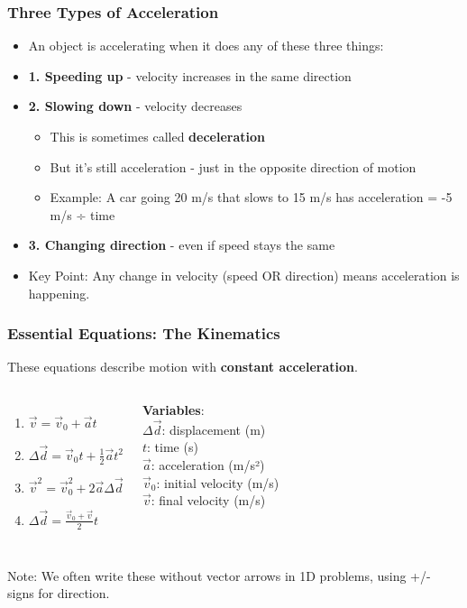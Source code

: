\documentclass{beamer}
\begin{document}
\begin{frame}
\frametitle{Three Types of Acceleration}
\begin{itemize}
    \item An object is accelerating when it does any of these three things:
    \pause
    \item \textbf{1. Speeding up} - velocity increases in the same direction
    \pause
    \item \textbf{2. Slowing down} - velocity decreases
    \pause
    \begin{itemize}
        \item This is sometimes called \textbf{deceleration}
        \item But it's still acceleration - just in the opposite direction of motion
        \item Example: A car going 20 m/s that slows to 15 m/s has acceleration = -5 m/s ÷ time
    \end{itemize}
    \pause
    \item \textbf{3. Changing direction} - even if speed stays the same
    \pause
    \item \alert{Key Point:} Any change in velocity (speed OR direction) means acceleration is happening.
\end{itemize}
\end{frame}

\begin{frame}
\frametitle{Essential Equations: The Kinematics}
These equations describe motion with \textbf{constant acceleration}.
\pause
\begin{columns}
\begin{enumerate}
    \item $\vec{v} = \vec{v}_0 + \vec{a}t$
    \pause
    \item $\Delta\vec{d} = \vec{v}_0 t + \frac{1}{2}\vec{a}t^2$
    \pause
    \item $\vec{v}^2 = \vec{v}_0^2 + 2\vec{a}\Delta\vec{d}$
    \pause
    \item $\Delta\vec{d} = \frac{\vec{v}_0 + \vec{v}}{2} t$
\end{enumerate}
\pause
\textbf{Variables}:\\
$\Delta\vec{d}$: displacement (m)\\
$t$: time (s)\\
$\vec{a}$: acceleration (m/s²)\\
$\vec{v}_0$: initial velocity (m/s)\\
$\vec{v}$: final velocity (m/s)
\end{columns}
\vspace{1em}
\pause
\alert{Note:} We often write these without vector arrows in 1D problems, using +/- signs for direction.
\end{frame}
\end{document}
